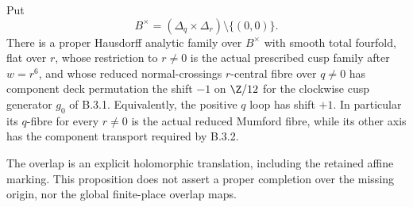 \begin{proposition}\label{push:src:B.4.18}
\label{push:B418}
Put
\[
 B^\times=(\Delta_q\times\Delta_r)\setminus\{(0,0)\}.
\]
There is a proper Hausdorff analytic family over
$B^\times$ with smooth total fourfold, flat over $r$,
whose restriction to $r\ne0$ is the actual prescribed
cusp family after $w=r^6$, and whose reduced
normal-crossings $r$-central fibre over $q\ne0$ has
component deck permutation the shift $-1$ on $\Z/12$
for the clockwise cusp generator $g_0$ of B.3.1.
Equivalently, the positive $q$ loop has shift $+1$.
In particular its $q$-fibre for every $r\ne0$ is the
actual reduced Mumford fibre, while its other axis has
the component transport required by B.3.2.

The overlap is an explicit holomorphic translation,
including the retained affine marking. This proposition
does not assert a proper completion over the missing
origin, nor the global finite-place overlap maps.
\end{proposition}

